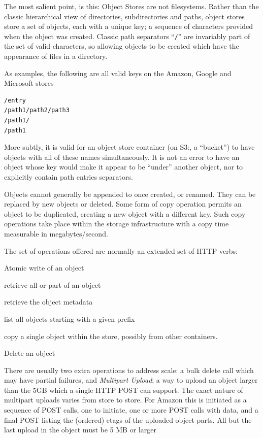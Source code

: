 \documentclass[conference]{IEEEtran}
\begin{document}


The most salient point, is this: Object Stores are not filesystems.
Rather than the classic hierarchical view of directories, subdirectories
and paths, object stores store a set of objects, each with a unique key;
a sequence of characters provided when the object was created.
Classic path separators ``\texttt{/}'' are invariably part of the set of valid
characters, so allowing objects to be created which have the appearance
of files in a directory.

As examples, the following are all valid keys on the Amazon, Google and Microsoft
stores

\begin{verbatim}
/entry
/path1/path2/path3
/path1/
/path1
\end{verbatim}

More subtly, it is valid for an object store container (on S3:, a ``bucket'')
to have objects with all of these names simultaneously.
It is not an error to have an object whose key would make it appear to be
``under'' another object, nor to explicitly contain path entries separators.

Objects cannot generally be appended to once created, or renamed.
They can be replaced by new objects or deleted.
Some form of copy operation permits an object to be duplicated, creating
a new object with a different key.
Such copy operations take place within the storage infrastructure with a
copy time measurable in megabytes/second.


The set of operations offered are normally an extended set of HTTP verbs:

\begin{description}[leftmargin=8em, style=nextline]
  \item[PUT] Atomic write of an object
  \item[GET] retrieve all or part of an object
  \item[HEAD] retrieve the object metadata
  \item[LIST] list all objects starting with a given prefix
  \item[COPY] copy a single object within the store, possibly from other containers.
  \item[DELETE] Delete an object
\end{description}

There are usually two extra operations to address scale:
 a bulk delete call which may have partial failures,
and \emph{Multipart Upload}; a way to upload an object larger than the
5GB which a single HTTP POST can support.
The exact nature of multipart uploads varies from store to store.
For Amazon this is initiated as a sequence of POST calls, one to initiate,
one or more POST calls with data, and a final POST listing the (ordered)
etags of the uploaded object parts.
All but the last upload in the object must be 5 MB or larger
\end{document}
